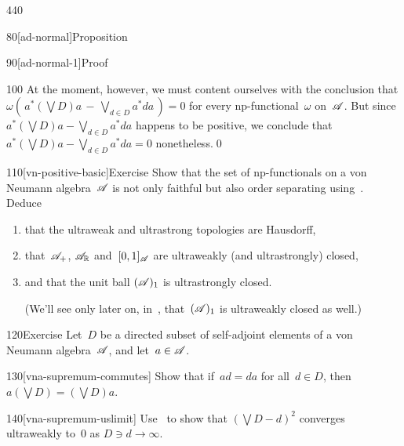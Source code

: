 \begin{parsec}{440}
\begin{point}{80}[ad-normal]{Proposition}
\begin{point}{90}[ad-normal-1]{Proof}
\begin{point}{100}
At the moment, however,
we must content ourselves with
the conclusion that
	$\omega(\,a^*(\bigvee D) a\,-\, \bigvee_{d\in D} a^* d a\,)=0$
for every np-functional~$\omega$ on~$\mathscr{A}$.
But since
	$a^*(\bigvee D) a - 
\bigvee_{d\in D} a^* da$
happens to be positive,
we conclude that
	$a^*(\bigvee D) a  
- \bigvee_{d\in D} a^* d a =0$
nonetheless.\qed
\end{point}
\end{point}
\end{point}
\begin{point}{110}[vn-positive-basic]{Exercise}%
Show that the set of np-functionals
on a von Neumann algebra~$\mathscr{A}$
is not only faithful 
but also order separating
using~.
Deduce
\begin{enumerate}%
\item%
%
that the ultraweak and ultrastrong topologies
are Hausdorff,
\item
that~$\mathscr{A}_+$, 
$\mathscr{A}_{\mathbb{R}}$ and~$[0,1]_{\mathscr{A}}$  are ultraweakly 
(and ultrastrongly) closed, 
\item
and that the unit ball
$(\mathscr{A})_1$
is ultrastrongly closed.

(We'll see only later on, in~,
that~$(\mathscr{A})_1$
is ultraweakly closed as well.)
\end{enumerate}
\spacingfix%
\end{point}%
\begin{point}{120}{Exercise}%
Let~$D$ be a directed subset of self-adjoint elements
of a von Neumann algebra~$\mathscr{A}$,
and let~$a\in\mathscr{A}$.
\begin{point}{130}[vna-supremum-commutes]%
Show that if~$ad=da$ for all~$d\in D$,
then $a(\bigvee D) = (\bigvee D)a $.
\end{point}
\begin{point}{140}[vna-supremum-uslimit]%
Use~
to show that $(\bigvee D-d)^2$ converges ultraweakly to~$0$
as $D\ni d\to\infty$.


\end{point}
\end{point}
\end{parsec}
